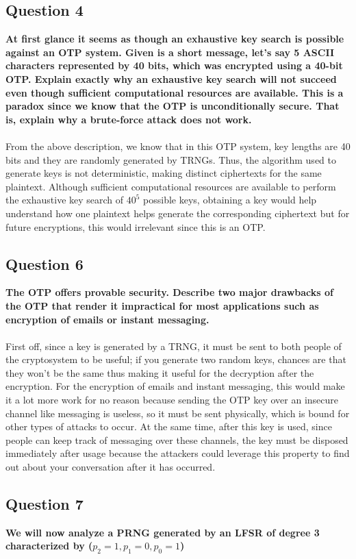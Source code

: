 \documentclass[titlepage]{article}
\begin{document}
{\subsection{Question 4}
{
\textbf{At first glance it seems as though an exhaustive key search is possible against an OTP system. Given is a short message, let’s say 5 ASCII characters represented by 40 bits, which was encrypted using a 40-bit OTP. Explain exactly why an exhaustive key search will not succeed even though sufficient computational resources are available. This is a paradox since we know that the OTP is unconditionally secure. That is, explain why a brute-force attack does not work.}\\\\
From the above description, we know that in this OTP system, key lengths are 40 bits and they are randomly generated by TRNGs. Thus, the algorithm used to generate keys is not deterministic, making distinct ciphertexts for the same plaintext. Although sufficient computational resources are available to perform the exhaustive key search of \(40^5\) possible keys, obtaining a key would help understand how one plaintext helps generate the corresponding ciphertext but for future encryptions, this would irrelevant since this is an OTP.
}
\clearpage
\subsection{Question 6}
{
\textbf{The OTP offers provable security. Describe two major drawbacks of the OTP that render it impractical for most applications such as encryption of emails or instant messaging.}\\\\
First off, since a key is generated by a TRNG, it must be sent to both people of the cryptosystem to be useful; if you generate two random keys, chances are that they won't be the same thus making it useful for the decryption after the encryption. For the encryption of emails and instant messaging, this would make it a lot more work for no reason because sending the OTP key over an insecure channel like messaging is useless, so it must be sent physically, which is bound for other types of attacks to occur. At the same time, after this key is used, since people can keep track of messaging over these channels, the key must be disposed immediately after usage because the attackers could leverage this property to find out about your conversation after it has occurred.
}
\subsection{Question 7}
{
\textbf{We will now analyze a PRNG generated by an LFSR of degree 3 characterized by (\(p_2 = 1, p_1 = 0, p_0 = 1\))}
}}
\end{document}
